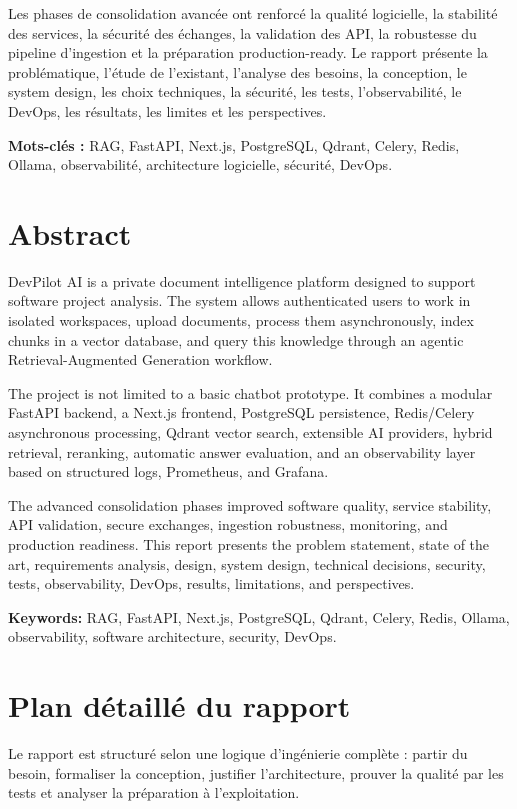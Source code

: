 \documentclass[12pt,a4paper,oneside]{report}
\begin{document}
Les phases de consolidation avancée ont renforcé la qualité logicielle, la stabilité des services, la sécurité des échanges, la validation des API, la robustesse du pipeline d'ingestion et la préparation production-ready. Le rapport présente la problématique, l'étude de l'existant, l'analyse des besoins, la conception, le system design, les choix techniques, la sécurité, les tests, l'observabilité, le DevOps, les résultats, les limites et les perspectives.

\textbf{Mots-clés :} RAG, FastAPI, Next.js, PostgreSQL, Qdrant, Celery, Redis, Ollama, observabilité, architecture logicielle, sécurité, DevOps.

\chapter*{Abstract}
DevPilot AI is a private document intelligence platform designed to support software project analysis. The system allows authenticated users to work in isolated workspaces, upload documents, process them asynchronously, index chunks in a vector database, and query this knowledge through an agentic Retrieval-Augmented Generation workflow.

The project is not limited to a basic chatbot prototype. It combines a modular FastAPI backend, a Next.js frontend, PostgreSQL persistence, Redis/Celery asynchronous processing, Qdrant vector search, extensible AI providers, hybrid retrieval, reranking, automatic answer evaluation, and an observability layer based on structured logs, Prometheus, and Grafana.

The advanced consolidation phases improved software quality, service stability, API validation, secure exchanges, ingestion robustness, monitoring, and production readiness. This report presents the problem statement, state of the art, requirements analysis, design, system design, technical decisions, security, tests, observability, DevOps, results, limitations, and perspectives.

\textbf{Keywords:} RAG, FastAPI, Next.js, PostgreSQL, Qdrant, Celery, Redis, Ollama, observability, software architecture, security, DevOps.

\tableofcontents
\listoffigures
\listoftables
\clearpage
{}

\chapter*{Plan détaillé du rapport}
Le rapport est structuré selon une logique d'ingénierie complète : partir du besoin, formaliser la conception, justifier l'architecture, prouver la qualité par les tests et analyser la préparation à l'exploitation.
\end{document}
